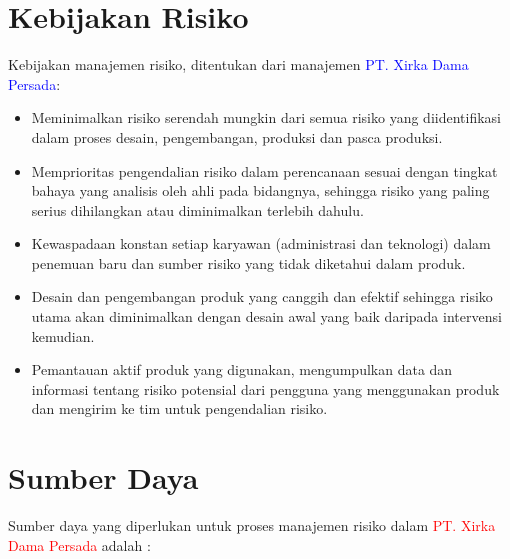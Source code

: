 \documentclass[11pt,a4paper,twoside,onecolumn]{book}
\begin{document}
		\section{Kebijakan Risiko}
		Kebijakan manajemen risiko, ditentukan dari manajemen \textcolor{blue}{PT. Xirka Dama Persada}:
		\begin{itemize}
			\item Meminimalkan risiko serendah mungkin dari semua risiko yang diidentifikasi dalam proses desain, pengembangan, produksi dan pasca produksi.
			\item Memprioritas pengendalian risiko dalam perencanaan sesuai dengan tingkat bahaya yang analisis oleh ahli pada bidangnya, sehingga risiko yang paling serius dihilangkan atau diminimalkan terlebih dahulu.
			\item Kewaspadaan konstan setiap karyawan (administrasi dan teknologi) dalam penemuan baru dan sumber risiko yang tidak diketahui dalam produk.
			\item Desain dan pengembangan produk yang canggih dan efektif sehingga risiko utama akan diminimalkan dengan desain awal yang baik daripada intervensi kemudian.
			\item Pemantauan aktif produk yang digunakan, mengumpulkan data dan informasi tentang risiko potensial dari pengguna yang menggunakan produk dan mengirim ke tim untuk pengendalian risiko.
		\end{itemize}
		
		\section{Sumber Daya}
		Sumber daya yang diperlukan untuk proses manajemen risiko dalam \textcolor{red}{PT. Xirka Dama Persada} adalah :
		
\end{document}
